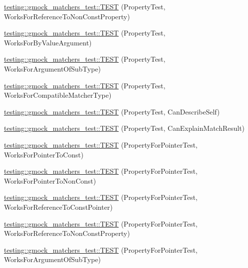 \begin{DoxyCompactItemize}
\item 
\hyperlink{namespacetesting_1_1gmock__matchers__test_a5b7b02e8fcef1aff9a4afc81d5fb5d5f}{testing\+::gmock\+\_\+matchers\+\_\+test\+::\+T\+E\+ST} (Property\+Test, Works\+For\+Reference\+To\+Non\+Const\+Property)
\item 
\hyperlink{namespacetesting_1_1gmock__matchers__test_af703b24e2bee13cf7a042f699809a5ab}{testing\+::gmock\+\_\+matchers\+\_\+test\+::\+T\+E\+ST} (Property\+Test, Works\+For\+By\+Value\+Argument)
\item 
\hyperlink{namespacetesting_1_1gmock__matchers__test_a38a5ad623dda9ef0f48ebaf65485d18e}{testing\+::gmock\+\_\+matchers\+\_\+test\+::\+T\+E\+ST} (Property\+Test, Works\+For\+Argument\+Of\+Sub\+Type)
\item 
\hyperlink{namespacetesting_1_1gmock__matchers__test_a17b7a59d1dbca0692ebaa71e6f46f1d6}{testing\+::gmock\+\_\+matchers\+\_\+test\+::\+T\+E\+ST} (Property\+Test, Works\+For\+Compatible\+Matcher\+Type)
\item 
\hyperlink{namespacetesting_1_1gmock__matchers__test_a8c749e210723e33547e58fe8822fb85e}{testing\+::gmock\+\_\+matchers\+\_\+test\+::\+T\+E\+ST} (Property\+Test, Can\+Describe\+Self)
\item 
\hyperlink{namespacetesting_1_1gmock__matchers__test_aff810d2cdd79c55d483965a28bb5069a}{testing\+::gmock\+\_\+matchers\+\_\+test\+::\+T\+E\+ST} (Property\+Test, Can\+Explain\+Match\+Result)
\item 
\hyperlink{namespacetesting_1_1gmock__matchers__test_ac9222439b8e0b1e080650d667044c140}{testing\+::gmock\+\_\+matchers\+\_\+test\+::\+T\+E\+ST} (Property\+For\+Pointer\+Test, Works\+For\+Pointer\+To\+Const)
\item 
\hyperlink{namespacetesting_1_1gmock__matchers__test_acc639f3cbeacf4af712bf02ac451b160}{testing\+::gmock\+\_\+matchers\+\_\+test\+::\+T\+E\+ST} (Property\+For\+Pointer\+Test, Works\+For\+Pointer\+To\+Non\+Const)
\item 
\hyperlink{namespacetesting_1_1gmock__matchers__test_a028687dfb04ec008ea129f9cc95aac62}{testing\+::gmock\+\_\+matchers\+\_\+test\+::\+T\+E\+ST} (Property\+For\+Pointer\+Test, Works\+For\+Reference\+To\+Const\+Pointer)
\item 
\hyperlink{namespacetesting_1_1gmock__matchers__test_a78762b60c9d0c985916b698e6d4c55e3}{testing\+::gmock\+\_\+matchers\+\_\+test\+::\+T\+E\+ST} (Property\+For\+Pointer\+Test, Works\+For\+Reference\+To\+Non\+Const\+Property)
\item 
\hyperlink{namespacetesting_1_1gmock__matchers__test_a4c2f4b483550e2e70b09eea3836b83e0}{testing\+::gmock\+\_\+matchers\+\_\+test\+::\+T\+E\+ST} (Property\+For\+Pointer\+Test, Works\+For\+Argument\+Of\+Sub\+Type)

\end{DoxyCompactItemize}
